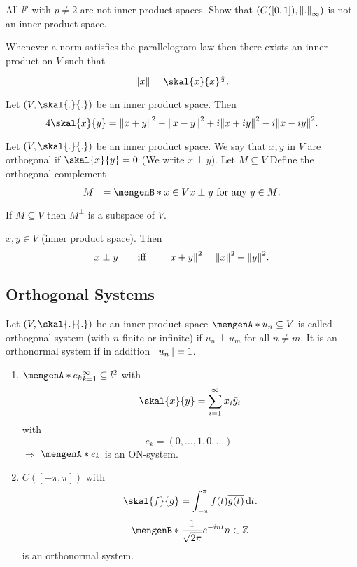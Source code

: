 All $l^p$ with $p \neq 2$ are not inner product spaces. 
Show that $(C([0,1]),\norm{.}_{\infty})$ is not an inner product space.
\begin{bemerkung}
	Whenever a norm satisfies the parallelogram law then there exists an inner product on $V$ such that
	\[
		\norm{x} = \skal{x}{x}^{\frac{1}{2}}.
	\]
\end{bemerkung}
\begin{theorem}
	Let $(V,\skal{.}{.})$ be an inner product space. Then 
	\[
		4 \skal{x}{y}  = \norm{x+y}^2- \norm{x-y}^2 + i \norm{x+ iy}^2 - i \norm{x - iy}^2.
	\]
\end{theorem}
\begin{definition}
	Let $(V, \skal{.}{.})$ be an inner product space. We say that $x,y$ in $V$ are orthogonal if $\skal{x}{y} = 0$ (We write $x \perp y$). Let $M \subseteq V$
	Define the orthogonal complement
	\[
		M^{\perp} = \set[x \in V]{x \perp y \text{ for any }y \in M}.
	\]
\end{definition}
\begin{proposition}
	If $M \subseteq V$ then $M^{\perp}$ is a subspace of $V$.
\end{proposition}
\begin{theorem}
	$x,y \in V$ (inner product space). Then
	\[
		x \perp y \qquad \text{iff} \qquad \norm{x+y}^2 = \norm{x}^2 + \norm{y}^2.
	\]
\end{theorem}

\subsection{Orthogonal Systems} 
\label{sub:orthogonal_systems}

Let $(V, \skal{.}{.})$ be an inner product space $\set{u_n} \subseteq V$ is called orthogonal system (with $n$ finite or infinite) if $u_n \perp u_m$ for all $n \neq m$. It is an orthonormal system if in addition $\norm{u_n}=1$. 

\begin{beispiele}
	\begin{enumerate}[1)]
		\item $\set{e_k}_{k=1}^{\infty} \subseteq l^2$ with 
		\[
			\skal{x}{y} = \sum^{\infty}_{i=1} x_i \bar{y}_i
		\]
		with 
		\[
			e_k = (0,\dots,1,0,\dots).
		\]
		$\Rightarrow$ $\set{e_k}$ is an ON-system. 
		\item $C([-\pi,\pi])$ with
		\[
			\skal{f}{g} = \int_{- \pi}^{\pi} f(t) \overline{g(t)} \,\mathrm{d}t.
		\]
		\[
			\set[\frac{1}{\sqrt{2 \pi}} e^{-int}]{n \in \mathbb{Z}}
		\]
		is an orthonormal system.
	\end{enumerate}
\end{beispiele}

